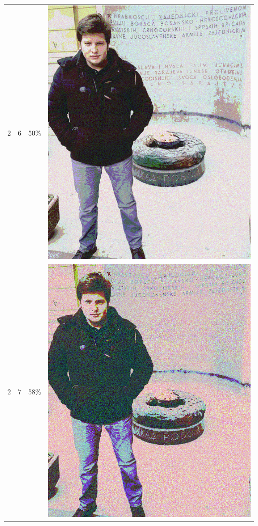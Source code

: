 \documentclass[times, utf8, seminar]{fer}
\begin{document}
\begin{center}
\begin{longtable}{|c|c|c|c|}
2 & 6 &50\% & \includegraphics[scale=0.3]{../benchmark_results/pattern/2_components-6_bits.png} \\
2 & 7 &58\% & \includegraphics[scale=0.3]{../benchmark_results/pattern/2_components-7_bits.png} \\

\end{longtable}
\end{center}
\end{document}
